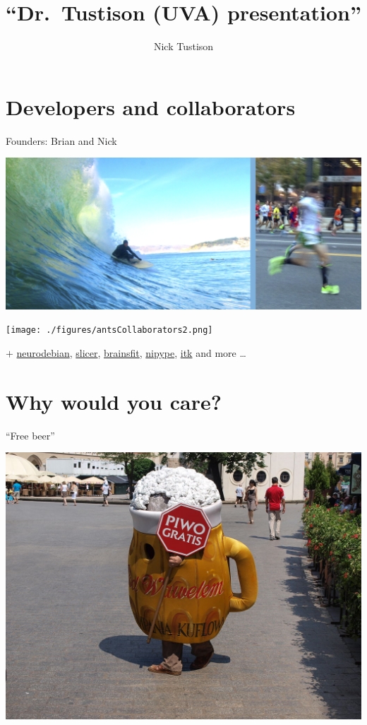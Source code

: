 \documentclass[ignorenonframetext,]{beamer}
\institute{University of Virginia}
\title{``Dr.~Tustison (UVA) presentation''}
\author{Nick Tustison}
\date{}
\begin{document}
\frame{\titlepage}

\section{Developers and
collaborators}\label{developers-and-collaborators}

\begin{frame}{Founders: Brian and Nick}

\includegraphics{./figures/brian_and_nick.png}

\end{frame}

\begin{frame}

\texttt{[image: ./figures/antsCollaborators2.png]}

\(+\) \href{http://neuro.debian.net/pkgs/ants.html}{neurodebian},
\href{http://www.slicer.org/}{slicer},
\href{https://github.com/BRAINSia/BRAINSTools}{brainsfit},
\href{http://nipy.sourceforge.net/nipype/}{nipype},
\href{http://www.itk.org}{itk} and more \ldots{}

\end{frame}

\section{Why would you care?}\label{why-would-you-care}

\begin{frame}{``Free beer''}

\includegraphics{./licenses/figures/freebeerfreespeech.jpg}

\end{frame}
\end{document}
